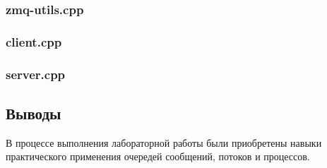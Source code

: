 \documentclass[12pt]{article}
\begin{document}
	
	
	\subsubsection*{zmq-utils.cpp}
	
	
	
	\subsubsection*{client.cpp}
	
	
	
	\subsubsection*{server.cpp}
	
	
	
	\subsection*{Выводы}
	
	В процессе выполнения лабораторной работы были приобретены навыки практического применения очередей сообщений, потоков и процессов.
	
\end{document}
